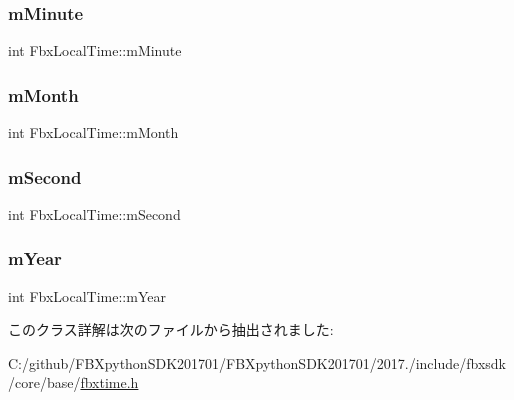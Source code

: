\subsubsection{\texorpdfstring{m\+Minute}{mMinute}}
{\footnotesize\ttfamily int Fbx\+Local\+Time\+::m\+Minute}

\mbox{\label{class_fbx_local_time_ab952f33eb09aaace10187d943f16331e}} 
\subsubsection{\texorpdfstring{m\+Month}{mMonth}}
{\footnotesize\ttfamily int Fbx\+Local\+Time\+::m\+Month}

\mbox{\label{class_fbx_local_time_a5ebbe9a0fb42e63790c1bb2d4844b86c}} 
\subsubsection{\texorpdfstring{m\+Second}{mSecond}}
{\footnotesize\ttfamily int Fbx\+Local\+Time\+::m\+Second}

\mbox{\label{class_fbx_local_time_a824c8b3c8dcab952b4e75436e696c519}} 
\subsubsection{\texorpdfstring{m\+Year}{mYear}}
{\footnotesize\ttfamily int Fbx\+Local\+Time\+::m\+Year}



このクラス詳解は次のファイルから抽出されました\+:\begin{DoxyCompactItemize}
\item 
C\+:/github/\+F\+B\+Xpython\+S\+D\+K201701/\+F\+B\+Xpython\+S\+D\+K201701/2017./include/fbxsdk/core/base/\hyperlink{fbxtime_8h}{fbxtime.\+h}\end{DoxyCompactItemize}
